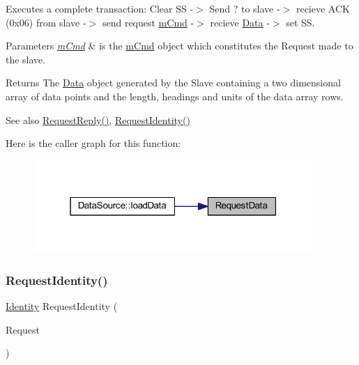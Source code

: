 Executes a complete transaction\+: Clear SS -\/$>$ Send \textquotesingle{}?\textquotesingle{} to slave -\/$>$ recieve \textquotesingle{}A\+CK\textquotesingle{} (0x06) from slave -\/$>$ send request \mbox{\hyperlink{structm_cmd}{m\+Cmd}} -\/$>$ recieve \mbox{\hyperlink{struct_data}{Data}} -\/$>$ set SS. 
\begin{DoxyParams}{Parameters}
{\em \mbox{\hyperlink{structm_cmd}{m\+Cmd}}} & is the \mbox{\hyperlink{structm_cmd}{m\+Cmd}} object which constitutes the Request made to the slave. \\
\hline
\end{DoxyParams}
\begin{DoxyReturn}{Returns}
The \mbox{\hyperlink{struct_data}{Data}} object generated by the Slave containing a two dimensional array of data points and the length, headings and units of the data array rows. 
\end{DoxyReturn}
\begin{DoxySeeAlso}{See also}
\mbox{\hyperlink{class_communicative_a4fe112ad5a3d693e39ae44dd43eaf0c1}{Request\+Reply()}}, \mbox{\hyperlink{class_communicative_a01ee3d76d85bad6123c4d4f6262c6c2d}{Request\+Identity()}} 
\end{DoxySeeAlso}
Here is the caller graph for this function\+:
\nopagebreak
\begin{figure}[H]
\begin{center}
\leavevmode
\includegraphics[width=301pt]{class_communicative_a0a56aaa3248edae66ccb13cbf2bf156a_icgraph}
\end{center}
\end{figure}
\mbox{\label{class_communicative_a01ee3d76d85bad6123c4d4f6262c6c2d}} 
\subsubsection{\texorpdfstring{RequestIdentity()}{RequestIdentity()}}
{\footnotesize\ttfamily \mbox{\hyperlink{struct_identity}{Identity}} Request\+Identity (\begin{DoxyParamCaption}\item[{const \mbox{\hyperlink{structm_cmd}{m\+Cmd}}}]{Request }\end{DoxyParamCaption})}



